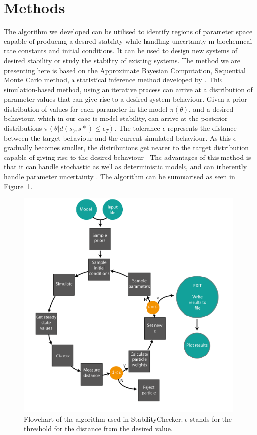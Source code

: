 \section{Methods}

The algorithm we developed can be utilised to identify regions of parameter space capable of producing a desired stability while handling uncertainty in biochemical rate constants and initial conditions. It can be used to design new systems of desired stability or study the stability of existing systems. The method we are presenting here is based on the Approximate Bayesian Computation, Sequential Monte Carlo method, a statistical inference method developed by \textcite{Toni:2009tr}. This simulation-based method, using an iterative process can arrive at a distribution of parameter values that can give rise to a desired system behaviour. Given a prior distribution of values for each parameter in the model $\pi(\theta)$, and a desired behaviour, which in our case is model stability, can arrive at the posterior distributions $\pi(\theta|d(s_0, s*)\leq \epsilon_T)$. The tolerance $\epsilon$ represents the distance between the target behaviour and the current simulated behaviour. As this $\epsilon$ gradually becomes smaller, the distributions get nearer to the target distribution capable of giving rise to the desired behaviour \autocite{Toni:2009tr}. The advantages of this method is that it can handle stochastic as well as deterministic models, and can inherently handle parameter uncertainty \autocite{Barnes:2011hh}. The algorithm can be summarised as seen in Figure~\ref{fig:flowchart}.

\begin{figure}[p]
	\centering
	\includegraphics[scale=0.5]{images/StabilityChecker_flowchart-01}
	\caption{Flowchart of the algorithm used in StabilityChecker. $\epsilon$ stands for the threshold for the distance from the desired value.}	
	\label{fig:flowchart}
\end{figure}

